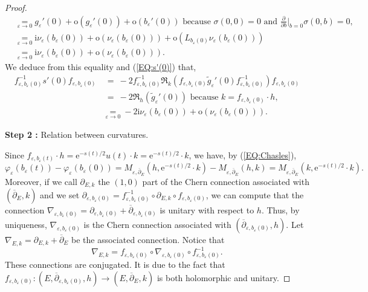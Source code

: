 \documentclass{article}
\theoremstyle{remark}
\theoremstyle{definition}
\newcommand{\landau}[2]{\underset{#1 \rightarrow #2}{=}}
\renewcommand{\i}{\boldsymbol{\mathrm{i}}}
\newcommand{\e}{\boldsymbol{\mathrm{e}}}
\newcommand{\dbar}{\overline{\partial}}
\begin{document}
\begin{proof}
\begin{align*}
    & \landau{\varepsilon}{0} g_\varepsilon'(0) + \mathrm{o}(g_\varepsilon'(0)) + \mathrm{o}(b_\varepsilon'(0)) \textrm{ because $\sigma(0,0) = 0$ and $\frac{\partial}{\partial b}|_{b = 0}\sigma(0,b) = 0$,}\\
    & \landau{\varepsilon}{0} \i\nu_\varepsilon(b_\varepsilon(0)) + \mathrm{o}(\nu_\varepsilon(b_\varepsilon(0))) + \mathrm{o}(L_{b_\varepsilon(0)}\nu_\varepsilon(b_\varepsilon(0)))\\
    & \landau{\varepsilon}{0} \i\nu_\varepsilon(b_\varepsilon(0)) + \mathrm{o}(\nu_\varepsilon(b_\varepsilon(0))).
\end{align*}
We deduce from this equality and (\ref{EQ:s'(0)}) that,
\begin{align}
    f_{\varepsilon,b_\varepsilon(0)}^{-1}s'(0)f_{\varepsilon,b_\varepsilon(0)} & \ =\ -2f_{\varepsilon,b_\varepsilon(0)}^{-1}\Re_k(f_{\varepsilon,b_\varepsilon(0)}\tilde{g}_\varepsilon'(0)f_{\varepsilon,b_\varepsilon(0)}^{-1})f_{\varepsilon,b_\varepsilon(0)} \nonumber\\
    & \ =\ -2\Re_h(\tilde{g}_\varepsilon'(0)) \textrm{ because } k = f_{\varepsilon,b_\varepsilon(0)} \cdot h, \nonumber\\
    & \landau{\varepsilon}{0} -2\i\nu_\varepsilon(b_\varepsilon(0)) + \mathrm{o}(\nu_\varepsilon(b_\varepsilon(0))). \label{EQ:f-1 s'(0) f}
\end{align}

\vspace{1mm}
\noindent\textbf{Step 2 :} Relation between curvatures.
\vspace{1mm}

Since $f_{\varepsilon,b_\varepsilon(t)} \cdot h = \e^{-s(t)/2}u(t) \cdot k = \e^{-s(t)/2} \cdot k$, we have, by (\ref{EQ:Chasles}),
$$
\varphi_\varepsilon(b_\varepsilon(t)) - \varphi_\varepsilon(b_\varepsilon(0)) = M_{\varepsilon,\dbar_E}(h,\e^{-s(t)/2} \cdot k) - M_{\varepsilon,\dbar_E}(h,k) = M_{\varepsilon,\dbar_E}(k,\e^{-s(t)/2} \cdot k).
$$
Moreover, if we call $\partial_{E,k}$ the $(1,0)$ part of the Chern connection associated with $(\dbar_E,k)$ and we set $\partial_{\varepsilon,b_\varepsilon(0)} = f_{\varepsilon,b_\varepsilon(0)}^{-1} \circ \partial_{E,k} \circ f_{\varepsilon,b_\varepsilon(0)}$, we can compute that the connection $\nabla_{\varepsilon,b_\varepsilon(0)} = \partial_{\varepsilon,b_\varepsilon(0)} + \dbar_{\varepsilon,b_\varepsilon(0)}$ is unitary with respect to $h$. Thus, by uniqueness, $\nabla_{\varepsilon,b_\varepsilon(0)}$ is the Chern connection associated with $(\dbar_{\varepsilon,b_\varepsilon(0)},h)$. Let $\nabla_{E,k} = \partial_{E,k} + \dbar_E$ be the associated connection. Notice that
$$
\nabla_{E,k} = f_{\varepsilon,b_\varepsilon(0)} \circ \nabla_{\varepsilon,b_\varepsilon(0)} \circ f_{\varepsilon,b_\varepsilon(0)}^{-1}.
$$
These connections are conjugated. It is due to the fact that $f_{\varepsilon,b_\varepsilon(0)} : (E,\dbar_{\varepsilon,b_\varepsilon(0)},h) \rightarrow (E,\dbar_E,k)$ is both holomorphic and unitary.


\end{proof}
\end{document}
